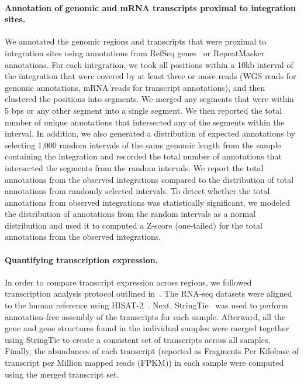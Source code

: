 \documentclass[a4,center,fleqn]{NAR}
\begin{document}
\paragraph{\textbf{Annotation of genomic and mRNA transcripts proximal to integration sites.}}
We annotated the genomic regions and transcripts that were proximal to integration
sites using annotations from RefSeq genes~\cite{OLeary2016} or
RepeatMasker~\cite{Tarailo-Graovac2009} annotations.  For each integration,
we took all positions within a 10kb interval of the integration that were 
covered by at least three or more reads (WGS reads for genomic annotations,
mRNA reads for transcript annotations), and then clustered the positions
into segments.  We merged any segments that were within 5 bps or any other
segment into a single segment.  We then reported the total number of unique annotations that intersected
any of the segments within the interval.  In addition, we also generated a distribution
of expected annotations by selecting 1,000 random intervals of the same genomic length from the sample 
containing the integration and recorded the total number of annotations that intersected the segments from 
the random intervals.  We report the total annotations from the observed integrations
compared to the distribution of total annotations from randomly selected intervals.  To detect whether the total annotations from observed integrations was statistically significant, we modeled the distribution of annotations from the random intervals as a normal distribution and used it to computed a Z-score (one-tailed) for the total annotations from the observed integrations.

\paragraph{\textbf{Quantifying transcription expression.}}
In order to compare transcript expression across regions, we followed transcription analysis protocol outlined in~\cite{Pertea2016}.  The RNA-seq datasets were aligned to the human reference using HISAT-2~\cite{Kim2015}.  Next, StringTie~\cite{Pertea2015} was used to perform annotation-free assembly of the transcripts for each sample.  Afterward, all the gene and gene structures found in the individual samples were merged together using StringTie to create a consistent set of transcripts across all samples.  Finally, the abundances of each transcript (reported as Fragments Per Kilobase of transcript per Million mapped reads (FPKM)) in each sample were computed using the merged transcript set.  
\end{document}
